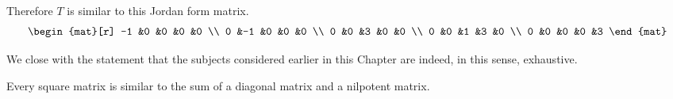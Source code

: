 \begin{example}
Therefore
\( T \) is similar to this Jordan form matrix.
\begin{equation*}
   \begin{mat}[r]
     -1  &0  &0  &0  &0  \\
      0  &-1 &0  &0  &0  \\    
      0  &0  &3  &0  &0  \\
      0  &0  &1  &3  &0  \\
      0  &0  &0  &0  &3  
   \end{mat}
\end{equation*}
\end{example}


We close with the statement that the subjects considered earlier in this
Chapter are indeed, in this sense, exhaustive.

\begin{corollary}
Every square matrix is similar to the sum of a diagonal matrix and a nilpotent
matrix.
\end{corollary}





